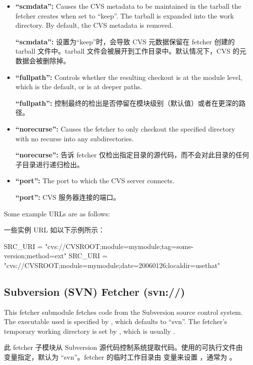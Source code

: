 \begin{itemize}
\item \textbf{``scmdata'':} Causes the CVS metadata to be maintained in the tarball the fetcher creates when set to ``keep''. The tarball is expanded into the work directory. By default, the CVS metadata is removed.

\medskip
\textbf{``scmdata'':} 设置为“keep”时，会导致 CVS 元数据保留在 fetcher 创建的 tarball 文件中。tarball 文件会被展开到工作目录中。默认情况下，CVS 的元数据会被删除掉。

\item \textbf{``fullpath'':} Controls whether the resulting checkout is at the module level, which is the default, or is at deeper paths.

\medskip
\textbf{``fullpath'':} 控制最终的检出是否停留在模块级别（默认值）或者在更深的路径。

\item \textbf{``norecurse'':} Causes the fetcher to only checkout the specified directory with no recurse into any subdirectories.

\medskip
\textbf{``norecurse'':} 告诉 fetcher 仅检出指定目录的源代码，而不会对此目录的任何子目录进行递归检出。

\item \textbf{``port'':} The port to which the CVS server connects.

\medskip
\textbf{``port'':} CVS 服务器连接的端口。
\end{itemize}
Some example URLs are as follows:

\medskip
一些实例 URL 如以下示例所示：

\medskip
\begin{pyglist}
SRC_URI = "cvs://CVSROOT;module=mymodule;tag=some-version;method=ext"
SRC_URI = "cvs://CVSROOT;module=mymodule;date=20060126;localdir=usethat"
\end{pyglist}

\subsection{Subversion (SVN) Fetcher (svn://)}

This fetcher submodule fetches code from the Subversion source control system. The executable used is specified by , which defaults to ``svn''. The fetcher's temporary working directory is set by , which is usually .

此 fetcher 子模块从 Subversion 源代码控制系统提取代码。使用的可执行文件由  变量指定，默认为 ``svn''。fetcher 的临时工作目录由  变量来设置 ，通常为 。

